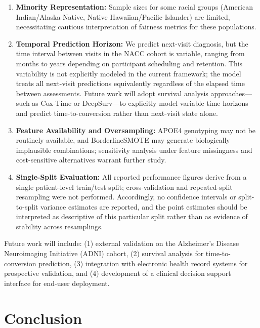 \documentclass[preprint,12pt]{elsarticle}
\begin{document}
\begin{enumerate}
    \item \textbf{Minority Representation:} Sample sizes for some racial groups (American Indian/Alaska Native, Native Hawaiian/Pacific Islander) are limited, necessitating cautious interpretation of fairness metrics for these populations.

    \item \textbf{Temporal Prediction Horizon:} We predict next-visit diagnosis, but the time interval between visits in the NACC cohort is variable, ranging from months to years depending on participant scheduling and retention. This variability is not explicitly modeled in the current framework; the model treats all next-visit predictions equivalently regardless of the elapsed time between assessments. Future work will adopt survival analysis approaches---such as Cox-Time or DeepSurv---to explicitly model variable time horizons and predict time-to-conversion rather than next-visit state alone.

    \item \textbf{Feature Availability and Oversampling:} APOE4 genotyping may not be routinely available, and BorderlineSMOTE may generate biologically implausible combinations; sensitivity analysis under feature missingness and cost-sensitive alternatives warrant further study.

    \item \textbf{Single-Split Evaluation:} All reported performance figures derive from a single patient-level train/test split; cross-validation and repeated-split resampling were not performed. Accordingly, no confidence intervals or split-to-split variance estimates are reported, and the point estimates should be interpreted as descriptive of this particular split rather than as evidence of stability across resamplings.
\end{enumerate}

Future work will include: (1) external validation on the Alzheimer's Disease Neuroimaging Initiative (ADNI) cohort, (2) survival analysis for time-to-conversion prediction, (3) integration with electronic health record systems for prospective validation, and (4) development of a clinical decision support interface for end-user deployment.

\section{Conclusion}
\end{document}
